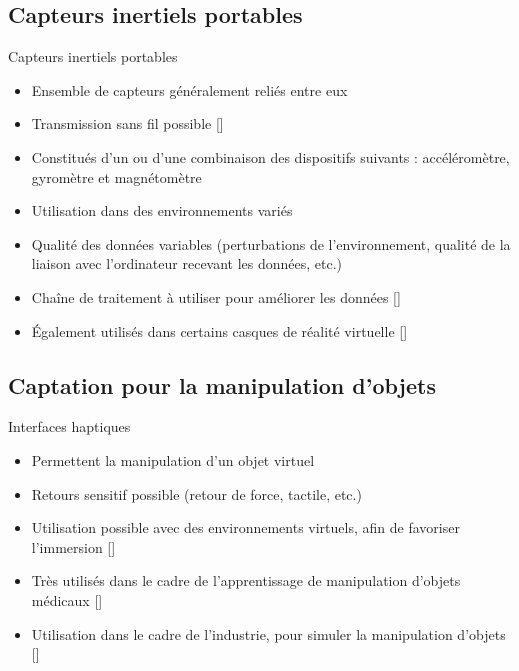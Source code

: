 \documentclass[svgnames]{beamer}
\newcommand{\mycite}[1]{[\textit{\cite{#1}}]}
\begin{document}
	\subsection{Capteurs inertiels portables}
	\begin{frame}{\subsecname}
		\begin{block}{Capteurs inertiels portables}
			\begin{itemize}[label=$\bullet$]
				\item Ensemble de capteurs généralement reliés entre eux
				\item Transmission sans fil possible \mycite{PORCIUNCULA2018S220}
				\item Constitués d'un ou d'une combinaison des dispositifs suivants : accéléromètre, gyromètre et magnétomètre
				\item Utilisation dans des environnements variés
				\item Qualité des données variables (perturbations de l'environnement, qualité de la liaison avec l'ordinateur recevant les données, etc.)
				\item Chaîne de traitement à utiliser pour améliorer les données \mycite{Roetenberg2005Com}
				\item Également utilisés dans certains casques de réalité virtuelle \mycite{HTCViveSpecs}
			\end{itemize}
		\end{block}
	\end{frame}
	
	\subsection{Captation pour la manipulation d'objets}
	\begin{frame}{\subsecname}
		\begin{block}{Interfaces haptiques}
			\begin{itemize}[label=$\bullet$]
				\item Permettent la manipulation d'un objet virtuel
				\item Retours sensitif possible (retour de force, tactile, etc.)
				\item Utilisation possible avec des environnements virtuels, afin de favoriser l'immersion \mycite{Whitmire2018}
				\item Très utilisés dans le cadre de l'apprentissage de manipulation d'objets médicaux \mycite{CORREA20196, Choi2015103, PEPLEY20171066, HALABI20189}
				\item Utilisation dans le cadre de l'industrie, pour simuler la manipulation d'objets \mycite{Chamaret2010}
			\end{itemize}
		\end{block}
	\end{frame}
	
\end{document}
